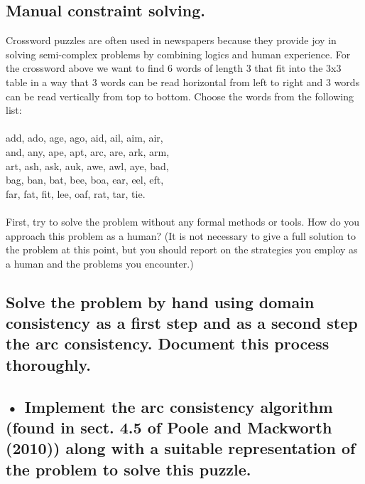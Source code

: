 \documentclass[paper=a4, fontsize=11pt]{scrartcl} %
\numberwithin{equation}{section} %
\numberwithin{figure}{section} %
\numberwithin{table}{section} %
\begin{document}
\subsection*{Manual constraint solving.}

Crossword puzzles are often used in newspapers because they provide joy in solving semi-complex problems by combining logics and human experience. For the crossword above we want to find 6 words of length 3 that fit into the 3x3 table in a way that 3 words can be read horizontal from left to right and 3 words can be read vertically from top to bottom. Choose the words from the following list:\\
\\
add, ado, age, ago, aid, ail, aim, air,\\
and, any, ape, apt, arc, are, ark, arm,\\
art, ash, ask, auk, awe, awl, aye, bad,\\
bag, ban, bat, bee, boa, ear, eel, eft,\\
far, fat, fit, lee, oaf, rat, tar, tie.\\
\\
First, try to solve the problem without any formal methods or tools. How do you approach this problem as a human? (It is not necessary to give a full solution to the problem at this point, but you should report on the strategies you employ as a human and the problems you encounter.)

\subsection*{Solve the problem by hand using domain consistency as a first step and as a second step the arc consistency. Document this process thoroughly.}



\subsection*{• Implement the arc consistency algorithm (found in sect. 4.5 of Poole and Mackworth (2010)) along with a suitable representation of the problem to solve this puzzle.}







\end{document}
